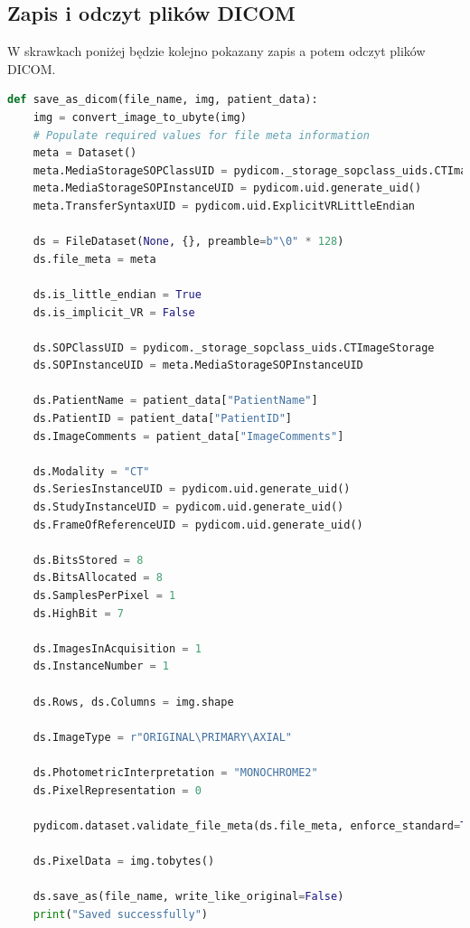 \documentclass[a4paper,11pt]{article}
\begin{document}
  \subsection{Zapis i odczyt plików DICOM}
  W skrawkach poniżej będzie kolejno pokazany zapis a potem odczyt plików DICOM.
  \begin{lstlisting}[language=Python, caption=save DICOM file, basicstyle=\tiny]
def save_as_dicom(file_name, img, patient_data):
    img = convert_image_to_ubyte(img)
    # Populate required values for file meta information
    meta = Dataset()
    meta.MediaStorageSOPClassUID = pydicom._storage_sopclass_uids.CTImageStorage
    meta.MediaStorageSOPInstanceUID = pydicom.uid.generate_uid()
    meta.TransferSyntaxUID = pydicom.uid.ExplicitVRLittleEndian  

    ds = FileDataset(None, {}, preamble=b"\0" * 128)
    ds.file_meta = meta

    ds.is_little_endian = True
    ds.is_implicit_VR = False

    ds.SOPClassUID = pydicom._storage_sopclass_uids.CTImageStorage
    ds.SOPInstanceUID = meta.MediaStorageSOPInstanceUID

    ds.PatientName = patient_data["PatientName"]
    ds.PatientID = patient_data["PatientID"]
    ds.ImageComments = patient_data["ImageComments"]

    ds.Modality = "CT"
    ds.SeriesInstanceUID = pydicom.uid.generate_uid()
    ds.StudyInstanceUID = pydicom.uid.generate_uid()
    ds.FrameOfReferenceUID = pydicom.uid.generate_uid()

    ds.BitsStored = 8
    ds.BitsAllocated = 8
    ds.SamplesPerPixel = 1
    ds.HighBit = 7

    ds.ImagesInAcquisition = 1
    ds.InstanceNumber = 1

    ds.Rows, ds.Columns = img.shape

    ds.ImageType = r"ORIGINAL\PRIMARY\AXIAL"

    ds.PhotometricInterpretation = "MONOCHROME2"
    ds.PixelRepresentation = 0

    pydicom.dataset.validate_file_meta(ds.file_meta, enforce_standard=True)

    ds.PixelData = img.tobytes()

    ds.save_as(file_name, write_like_original=False)
    print("Saved successfully")    
  \end{lstlisting}
\end{document}
